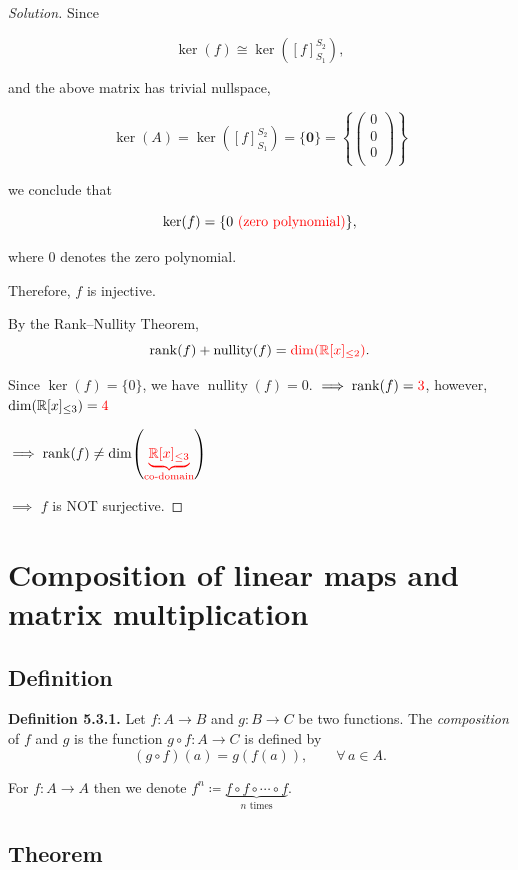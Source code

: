 \documentclass[12pt]{article}
\newenvironment{solution}
{\begin{proof}[Solution]}
{\end{proof}}
\begin{document}
\begin{solution}
Since

\[
\ker(f)
\cong
\ker([f]_{S_1}^{S_2}),
\]

and the above matrix has trivial nullspace,

\[
\ker(A)=\ker([f]_{S_1}^{S_2})=\{\mathbf0\}=
\left\{
\begin{pmatrix}
0\\
0\\
0\\
\end{pmatrix}
\right\}
\]

we conclude that

\[
\ker(f)=\{0\textcolor{red}{\text{ (zero polynomial)}}\},
\]

where $0$ denotes the zero polynomial.

Therefore, $f$ is injective.


By the Rank--Nullity Theorem,
\[
\operatorname{rank}(f)+\operatorname{nullity}(f)=\textcolor{red}{\dim\!\left(\mathbb{R}[x]_{\le2}\right)}.
\]

Since $\ker(f)=\{0\}$, we have $\operatorname{nullity}(f)=0$.
$\implies\operatorname{rank}(f)=\textcolor{red}{3}$, however, $\dim\!\left(\mathbb{R}[x]_{\le3}\right)=\textcolor{red}{4}$

$\implies\operatorname{rank}(f)\neq\dim\!\left(\textcolor{red}{\underbrace{\mathbb{R}[x]_{\le3}}_{\text{co-domain}}}\right)$

$\implies$ $f$ is NOT surjective.
\end{solution}

\newpage

\section{Composition of linear maps and matrix multiplication}

\subsection{Definition}

\textbf{Definition 5.3.1.}
Let $f:A\to B$ and $g:B\to C$ be two functions.
The \emph{composition} of $f$ and $g$ is the function $g\circ f:A\to C$ is defined by
\[
(g\circ f)(a)=g(f(a)),\qquad \forall\,a\in A.
\]

For $f:A\to A$ then we denote $f^n\coloneq\underbrace{f\circ f\circ\cdots\circ f}_{n\text{ times}}$.

\subsection{Theorem}
\end{document}
